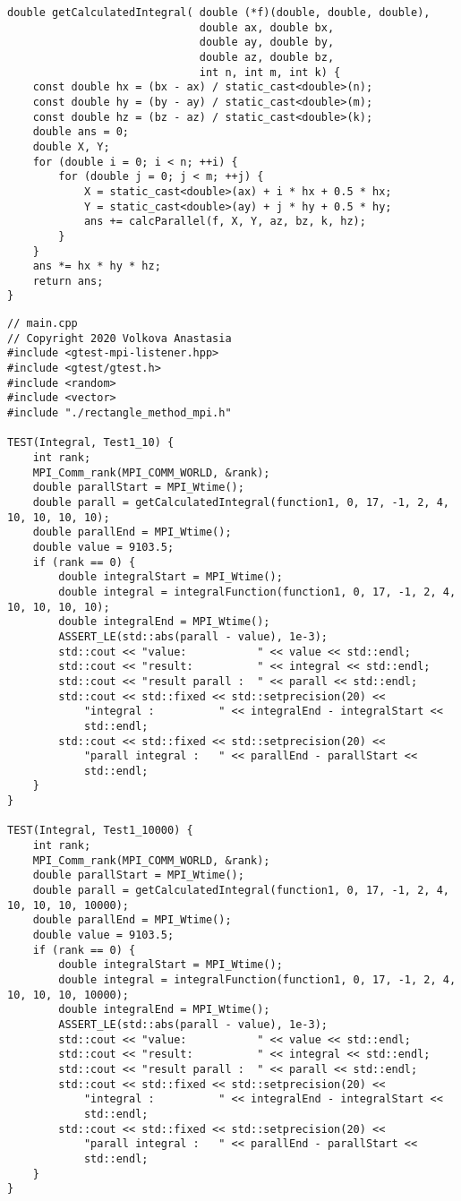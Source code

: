 \documentclass{report}
\begin{document}
\begin{lstlisting}
double getCalculatedIntegral( double (*f)(double, double, double),
                              double ax, double bx,
                              double ay, double by,
                              double az, double bz,
                              int n, int m, int k) {
    const double hx = (bx - ax) / static_cast<double>(n);
    const double hy = (by - ay) / static_cast<double>(m);
    const double hz = (bz - az) / static_cast<double>(k);
    double ans = 0;
    double X, Y;
    for (double i = 0; i < n; ++i) {
        for (double j = 0; j < m; ++j) {
            X = static_cast<double>(ax) + i * hx + 0.5 * hx;
            Y = static_cast<double>(ay) + j * hy + 0.5 * hy;
            ans += calcParallel(f, X, Y, az, bz, k, hz);
        }
    }
    ans *= hx * hy * hz;
    return ans;
}
\end{lstlisting}
\begin{lstlisting}
// main.cpp
// Copyright 2020 Volkova Anastasia
#include <gtest-mpi-listener.hpp>
#include <gtest/gtest.h>
#include <random>
#include <vector>
#include "./rectangle_method_mpi.h"

TEST(Integral, Test1_10) {
    int rank;
    MPI_Comm_rank(MPI_COMM_WORLD, &rank);
    double parallStart = MPI_Wtime();
    double parall = getCalculatedIntegral(function1, 0, 17, -1, 2, 4, 10, 10, 10, 10);
    double parallEnd = MPI_Wtime();
    double value = 9103.5;
    if (rank == 0) {
        double integralStart = MPI_Wtime();
        double integral = integralFunction(function1, 0, 17, -1, 2, 4, 10, 10, 10, 10);
        double integralEnd = MPI_Wtime();
        ASSERT_LE(std::abs(parall - value), 1e-3);
        std::cout << "value:           " << value << std::endl;
        std::cout << "result:          " << integral << std::endl;
        std::cout << "result parall :  " << parall << std::endl;
        std::cout << std::fixed << std::setprecision(20) <<
            "integral :          " << integralEnd - integralStart <<
            std::endl;
        std::cout << std::fixed << std::setprecision(20) <<
            "parall integral :   " << parallEnd - parallStart <<
            std::endl;
    }
}

TEST(Integral, Test1_10000) {
    int rank;
    MPI_Comm_rank(MPI_COMM_WORLD, &rank);
    double parallStart = MPI_Wtime();
    double parall = getCalculatedIntegral(function1, 0, 17, -1, 2, 4, 10, 10, 10, 10000);
    double parallEnd = MPI_Wtime();
    double value = 9103.5;
    if (rank == 0) {
        double integralStart = MPI_Wtime();
        double integral = integralFunction(function1, 0, 17, -1, 2, 4, 10, 10, 10, 10000);
        double integralEnd = MPI_Wtime();
        ASSERT_LE(std::abs(parall - value), 1e-3);
        std::cout << "value:           " << value << std::endl;
        std::cout << "result:          " << integral << std::endl;
        std::cout << "result parall :  " << parall << std::endl;
        std::cout << std::fixed << std::setprecision(20) <<
            "integral :          " << integralEnd - integralStart <<
            std::endl;
        std::cout << std::fixed << std::setprecision(20) <<
            "parall integral :   " << parallEnd - parallStart <<
            std::endl;
    }
}


\end{lstlisting}
\end{document}
